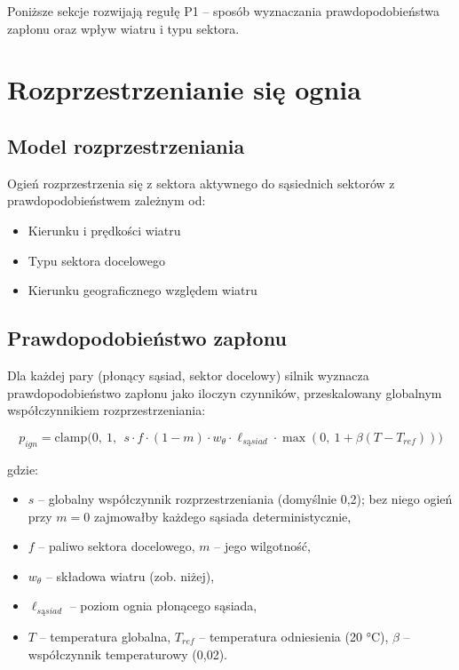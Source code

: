 \documentclass[11pt,a4paper]{article}
\begin{document}
Poniższe sekcje rozwijają regułę P1 -- sposób wyznaczania prawdopodobieństwa zapłonu oraz wpływ wiatru i typu sektora.

\section{Rozprzestrzenianie się ognia}

\subsection{Model rozprzestrzeniania}

Ogień rozprzestrzenia się z sektora aktywnego do sąsiednich sektorów z prawdopodobieństwem zależnym od:
\begin{itemize}
    \item Kierunku i prędkości wiatru
    \item Typu sektora docelowego
    \item Kierunku geograficznego względem wiatru
\end{itemize}

\subsection{Prawdopodobieństwo zapłonu}
\label{sec:ignition}

Dla każdej pary (płonący sąsiad, sektor docelowy) silnik wyznacza prawdopodobieństwo zapłonu jako iloczyn czynników, przeskalowany globalnym współczynnikiem rozprzestrzeniania:

\begin{equation}
p_{ign} = \mathrm{clamp}\!\Big(0,\ 1,\ \ s \cdot f \cdot (1 - m) \cdot w_{\theta} \cdot \ell_{sąsiad} \cdot \max(0,\ 1 + \beta (T - T_{ref}))\Big)
\end{equation}

gdzie:
\begin{itemize}
    \item $s$ -- globalny współczynnik rozprzestrzeniania (domyślnie 0,2); bez niego ogień przy $m=0$ zajmowałby każdego sąsiada deterministycznie,
    \item $f$ -- paliwo sektora docelowego, $m$ -- jego wilgotność,
    \item $w_{\theta}$ -- składowa wiatru (zob. niżej),
    \item $\ell_{sąsiad}$ -- poziom ognia płonącego sąsiada,
    \item $T$ -- temperatura globalna, $T_{ref}$ -- temperatura odniesienia (20 °C), $\beta$ -- współczynnik temperaturowy (0,02).
\end{itemize}
\end{document}
